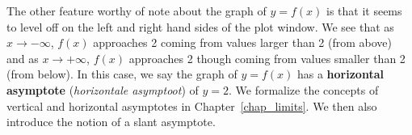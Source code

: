 The other feature worthy of note about the graph of $y=f(x)$ is that it seems to level off on the left and right hand sides of the plot window.  
We see that as $x \rightarrow -\infty$, $f(x)$ approaches 2 coming from values larger than 2 (from above) and as $x \rightarrow +\infty$, $f(x)$ approaches 2 though coming from values smaller than 2 (from below).   In this case, we say the graph of $y=f(x)$ has a \textbf{horizontal asymptote} (\textit{horizontale asymptoot}) of $y=2$.    We formalize the concepts of vertical and horizontal asymptotes in Chapter~\ref{chap_limits}.  We then also introduce the notion of a slant asymptote. 

